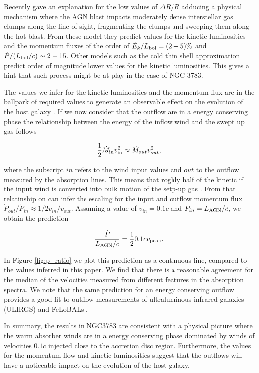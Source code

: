 \documentclass{report}
\begin{document}
Recently \cite{Faucher-Giguere2012} gave an explanation for
the low values of $\Delta R/R$ adducing a physical mechanism where the AGN
blast impacts moderately dense interstellar gas clumps along the line
of sight, fragmenting the clumps and sweeping them along the hot
blast. From these model they predict values for the kinetic
luminosities and the momentum fluxes of the order of $\dot{E}_k/L_{\rm
bol}= (2-5)\%$ and $\dot{P}/(L_{\rm bol}/c)\sim 2-15$. Other models
such as the cold thin shell approximation predict order of magnitude
lower values for the kinetic luminosities. This gives a hint that such
process might be at play in the case of NGC-3783. 

The values we infer for the kinetic luminosities and the momentum flux
are in the ballpark of required values to generate an observable
effect on the evolution of the host galaxy
\cite{DiMatteo2005,Debuhr2012}. If we now consider that the outflow 
are in a energy conserving phase the relationship between the energy
of the inflow wind and the swept up gas follows 

\begin{equation}
\frac{1}{2}\dot{M}_{\rm in}v_{\rm in}^2 \approx \dot{M}_{out}v_{out}^2, 
\end{equation}

where the subscript $in$ refers to the wind input values and $out$ to
the outflow measured by the absorption lines. This means that
roghly half of the kinetic if the input wind is converted into bulk
motion of the setp-up gas  \cite{FaucherGiguere2012}. From that
relatinship on can infer the escaling for the input and outflow
momentum flux $\dot{P}_{out}/\dot{P}_{in}\approx 1/2
v_{in}/v_{out}$. Assuming a value of $v_{in}=0.1c$ and $P_{in}=L_{\rm
  AGN}/c$, we obtain the prediction

\begin{equation}
\frac{\dot{P}}{L_{\rm AGN}/c} = \frac{1}{2}{0.1c}{v_{\rm peak}}.
\end{equation}

In Figure \ref{fig:p_ratio} we plot this prediction as a continuous
line, compared to the values inferred in this paper. We find that
there is a reasonable agreement for the median of the velocities
measured from different features in the absorption spectra. We note
that the same prediction for an energy conserving outflow provides a
good fit to outflow measurements of ultraluminous infrared galaxies
(ULIRGS) and FeLoBALs \cite{FaucherGiguere2012}.

In summary, the results in NGC3783 are consistent with a physical
picture where the warm absorber winds are in a energy conserving phase
dominated by winds of velocities $0.1c$ injected close to the accretion
disc region. Furthermore, the values for the momentum flow and kinetic
luminosities suggest that the outflows will have a noticeable impact
on the evolution of the host galaxy.
\end{document}
